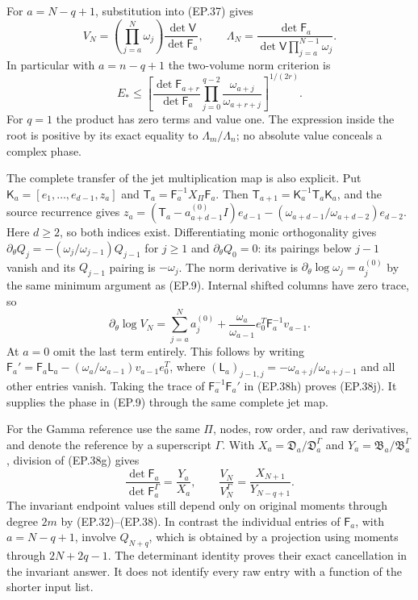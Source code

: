 For $a=N-q+1$, substitution into (EP.37) gives
\[
 V_N=\left(\prod_{j=a}^{N}\omega_j\right)
 \frac{\det\mathsf V}{\det\mathsf F_a},\qquad
 \Lambda_N=\frac{\det\mathsf F_a}
 {\det\mathsf V\prod_{j=a}^{N-1}\omega_j}.\tag{EP.38h}
\]
In particular with $a=n-q+1$ the two-volume norm criterion is
\[
 \boxed{E_*\le
 \left[\frac{\det\mathsf F_{a+r}}{\det\mathsf F_a}
 \prod_{j=0}^{q-2}\frac{\omega_{a+j}}{\omega_{a+r+j}}
 \right]^{1/(2r)}.}\tag{EP.38i}
\]
For $q=1$ the product has zero terms and value one. The expression
inside the root is positive by its exact equality to
$\Lambda_m/\Lambda_n$; no absolute value conceals a complex phase.

The complete transfer of the jet multiplication map is also explicit.
Put $\mathsf K_a=[e_1,\ldots,e_{d-1},z_a]$ and
$\mathsf T_a=\mathsf F_a^{-1}X_\Pi\mathsf F_a$. Then
$\mathsf T_{a+1}=\mathsf K_a^{-1}\mathsf T_a\mathsf K_a$,
and the source recurrence gives
$z_a=(\mathsf T_a-a_{a+d-1}^{(0)}I)e_{d-1}
-(\omega_{a+d-1}/\omega_{a+d-2})e_{d-2}$.
Here $d\ge2$, so both indices exist. Differentiating monic
orthogonality gives
$\partial_\theta Q_j=-(\omega_j/\omega_{j-1})Q_{j-1}$ for $j\ge1$
and $\partial_\theta Q_0=0$:
its pairings below $j-1$ vanish and its $Q_{j-1}$ pairing is
$-\omega_j$. The norm derivative is
$\partial_\theta\log\omega_j=a_j^{(0)}$ by the same minimum
argument as (EP.9). Internal shifted columns have zero trace, so
\[
 \partial_\theta\log V_N
 =\sum_{j=a}^{N}a_j^{(0)}
 +\frac{\omega_a}{\omega_{a-1}}
 e_0^T\mathsf F_a^{-1}v_{a-1}.\tag{EP.38j}
\]
At $a=0$ omit the last term entirely. This follows by writing
$\mathsf F_a'=\mathsf F_a\mathsf L_a
-(\omega_a/\omega_{a-1})v_{a-1}e_0^T$, where
$(\mathsf L_a)_{j-1,j}=-\omega_{a+j}/\omega_{a+j-1}$ and
all other entries vanish. Taking the trace of
$\mathsf F_a^{-1}\mathsf F_a'$ in (EP.38h) proves (EP.38j).
It supplies the phase in (EP.9) through the same complete jet map.

For the Gamma reference use the same $\Pi$, nodes, row order, and
raw derivatives, and denote the reference by a superscript $\Gamma$.
With $X_a=\mathfrak D_a/\mathfrak D_a^\Gamma$ and
$Y_a=\mathfrak B_a/\mathfrak B_a^\Gamma$, division of (EP.38g) gives
\[
 \frac{\det\mathsf F_a}{\det\mathsf F_a^\Gamma}=\frac{Y_a}{X_a},
 \qquad \frac{V_N}{V_N^\Gamma}=\frac{X_{N+1}}{Y_{N-q+1}}.
\tag{EP.38k}
\]
The invariant endpoint values still depend only on original moments
through degree $2m$ by (EP.32)--(EP.38). In contrast the individual
entries of $\mathsf F_a$, with $a=N-q+1$, involve $Q_{N+q}$,
which is obtained by a projection using moments through $2N+2q-1$.
The determinant identity proves their exact cancellation in the
invariant answer. It does not identify every raw entry with a function
of the shorter input list.


